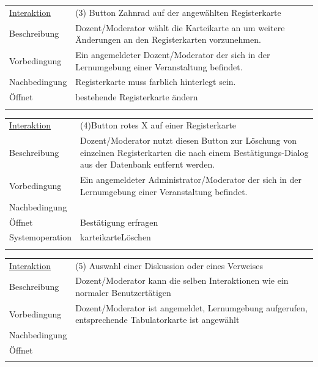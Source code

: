 \documentclass[12pt,a4paper]{article}
\begin{document}
{\begin{tabular}{l p{12cm}}
\underline{Interaktion} & (3) Button Zahnrad auf der angewählten Registerkarte\\ 
Beschreibung   	 		& Dozent/Moderator wählt die Karteikarte an um weitere Änderungen an den Registerkarten vorzunehmen. \\
Vorbedingung	 		& Ein angemeldeter Dozent/Moderator der sich in der Lernumgebung einer Veranstaltung befindet.\\
Nachbedingung	 		& Registerkarte muss farblich hinterlegt sein.\\
Öffnet			 		& \glqq bestehende Registerkarte ändern\grqq \\\\
\end{tabular}

\begin{tabular}{l p{12cm}}
\underline{Interaktion} & (4)Button rotes X auf einer Registerkarte  \\ 
Beschreibung   	 		& Dozent/Moderator nutzt diesen Button zur Löschung von einzelnen Registerkarten die nach einem Bestätigungs-Dialog aus der Datenbank entfernt werden. \\
Vorbedingung	 		& Ein angemeldeter Administrator/Moderator der sich in der Lernumgebung einer Veranstaltung befindet. \\
Nachbedingung	 		& \\
Öffnet			 		& \glqq Bestätigung erfragen \grqq \\
Systemoperation & karteikarteLöschen\\\\
\end{tabular}

\begin{tabular}{l p{12cm}}
\underline{Interaktion} & (5)  Auswahl einer Diskussion oder eines Verweises \\ 
Beschreibung   	 		& Dozent/Moderator kann die selben Interaktionen wie ein \glqq normaler Benutzer\grqq tätigen \\
Vorbedingung	 		& Dozent/Moderator ist angemeldet, Lernumgebung aufgerufen, entsprechende Tabulatorkarte ist angewählt\\
Nachbedingung	 		& \\
Öffnet			 		&  \\\\
\end{tabular}

}
\end{document}
